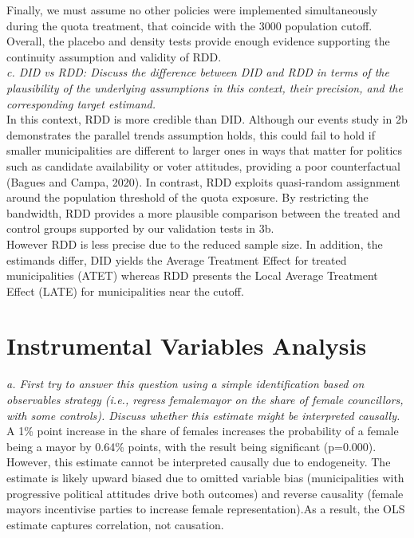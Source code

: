 \documentclass[12pt]{article}
\begin{document}
Finally, we must assume no other policies were implemented simultaneously during the quota treatment, that coincide with the 3000 population cutoff. Overall, the placebo and density tests provide enough evidence supporting the continuity assumption and validity of RDD.\\

\noindent
\textit{c. DID vs RDD: Discuss the difference between DID and RDD in terms of the plausibility of the underlying assumptions in this context, their precision, and the corresponding target estimand.}\\

In this context, RDD is more credible than DID. Although our events study in 2b demonstrates the parallel trends assumption holds, this could fail to hold if smaller municipalities are different to larger ones in ways that matter for politics such as candidate availability or voter attitudes, providing a poor counterfactual (Bagues and Campa, 2020). In contrast, RDD exploits quasi-random assignment around the population threshold of the quota exposure. By restricting the bandwidth, RDD provides a more plausible comparison between the treated and control groups supported by our validation tests in 3b.\\

However RDD is less precise due to the reduced sample size. In addition, the estimands differ, DID yields the Average Treatment Effect for treated municipalities (ATET) whereas RDD presents the Local Average Treatment Effect (LATE) for municipalities near the cutoff.\\

\section{Instrumental Variables Analysis}

\textit{a. First try to answer this question using a simple identification based on observables strategy (i.e., regress femalemayor on the share of female councillors, with some controls). Discuss whether this estimate might be interpreted causally.}\\

A 1\% point increase in the share of females increases the probability of a female being a mayor by 0.64\% points, with the result being significant (p=0.000). However, this estimate cannot be interpreted causally due to endogeneity. The estimate is likely upward biased due to omitted variable bias (municipalities with progressive political attitudes drive both outcomes) and reverse causality (female mayors incentivise parties to increase female representation).As a result, the OLS estimate captures correlation, not causation.\\
\end{document}
